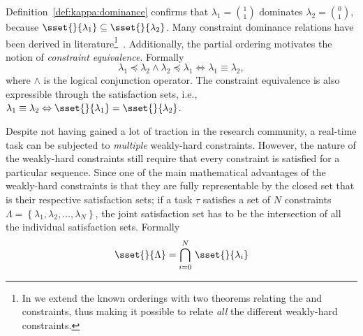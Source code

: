 %
Definition~\ref{def:kappa:dominance} confirms that $\lambda_1 = \binom{1}{1}$ dominates $\lambda_2 = \binom{0}{1}$, because $\sset{}{\lambda_1} \subseteq \sset{}{\lambda_2}$.
Many constraint dominance relations have been derived in literature\footnote{In  we extend the known orderings with two theorems relating the \tAH{} and \tRH{} constraints, thus making it possible to relate \emph{all} the different weakly-hard constraints.}~\cite{Bernat:2001}.
Additionally, the partial ordering motivates the notion of \emph{constraint equivalence}.
Formally
%
\begin{equation}
    \lambda_1 \preceq \lambda_2 \land \lambda_2 \preceq \lambda_1 \Leftrightarrow \lambda_1 \equiv \lambda_2,
\end{equation}
%
where $\land$ is the logical conjunction operator.
The constraint equivalence is also expressible through the satisfaction sets, i.e., $\lambda_1 \equiv \lambda_2 \Leftrightarrow \sset{}{\lambda_1} = \sset{}{\lambda_2}$.

Despite not having gained a lot of traction in the research community, a real-time task can be subjected to \emph{multiple} weakly-hard constraints.
However, the nature of the weakly-hard constraints still require that every constraint is satisfied for a particular sequence.
Since one of the main mathematical advantages of the weakly-hard constraints is that they are fully representable by the closed set that is their respective satisfaction sets; if a task $\tau$ satisfies a set of $N$ constraints $\Lambda = \left\{ \lambda_1, \lambda_2, \ldots, \lambda_N \right\}$, the joint satisfaction set has to be the intersection of all the individual satisfaction sets.
Formally
%
\begin{equation}
    \sset{}{\Lambda} = \bigcap_{i=0}^N \, \sset{}{\lambda_i}
\end{equation}

\begin{figure}[t]
    \centering
    
    \caption{}
    \label{fig:schedule}
\end{figure}

